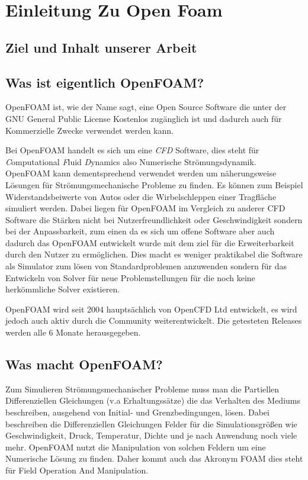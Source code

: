 %
%
%
%
\section{Einleitung Zu Open Foam\label{openfoam:section:Einleitung}}
\subsection{Ziel und Inhalt unserer Arbeit}

\subsection{Was ist eigentlich OpenFOAM?\label{openfoam:section:WasIstOpenFoam}}
OpenFOAM ist, wie der Name sagt, eine Open Source Software die unter der GNU
General Public License Kostenlos zugänglich ist und dadurch auch für Kommerzielle Zwecke 
verwendet werden kann. 

Bei OpenFOAM handelt es sich um eine \emph{CFD} Software, 
dies steht für \emph{C}omputational \emph{F}luid \emph{D}ynamics also Numerische Strömungsdynamik.
OpenFOAM kann dementsprechend verwendet werden um näherungsweise Lösungen für 
Strömungsmechanische Probleme zu finden.
Es können zum Beispiel Widerstandsbeiwerte von Autos oder die Wirbelschleppen einer Tragfläche simuliert werden.
Dabei liegen für OpenFOAM im Vergleich zu anderer CFD Software die Stärken nicht bei Nutzerfreundlichkeit oder Geschwindigkeit sondern bei der Anpassbarkeit, zum einen da es sich um offene Software aber auch dadurch das OpenFOAM entwickelt wurde mit dem ziel für die Erweiterbarkeit durch den Nutzer zu ermöglichen. Dies macht es weniger praktikabel die Software als Simulator zum lösen von Standardproblemen anzuwenden sondern für das Entwickeln von Solver für neue Problemstellungen für die noch keine herkömmliche Solver existieren.

OpenFOAM wird seit 2004 hauptsächlich von OpenCFD Ltd entwickelt, es wird jedoch auch aktiv durch die Community weiterentwickelt.
Die getesteten Releases werden alle 6 Monate herausgegeben. \cite{openfoam:greenshieldsweller2022}

\subsection{Was macht OpenFOAM?}
Zum Simulieren Strömungsmechanischer Probleme muss man die Partiellen Differenziellen Gleichungen (v.a Erhaltungssätze) die das Verhalten des Mediums beschreiben, ausgehend von Initial- und Grenzbedingungen, lösen.
Dabei beschreiben die Differenziellen Gleichungen Felder für die Simulationsgrößen wie Geschwindigkeit, Druck, Temperatur, Dichte und je nach Anwendung noch viele mehr. OpenFOAM nutzt die Manipulation von solchen Feldern um eine Numerische Lösung zu finden. Daher kommt auch das Akronym FOAM dies steht für Field Operation And  Manipulation.

